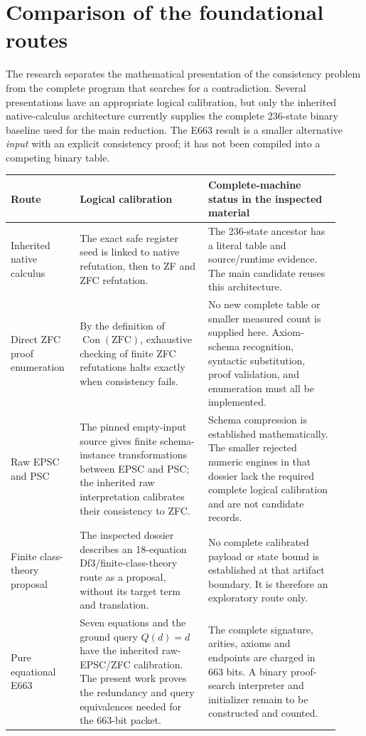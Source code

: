 \section{Comparison of the foundational routes}
\label{sec:formalism-comparison}

The research separates the mathematical presentation of the consistency
problem from the complete program that searches for a contradiction.
Several presentations have an appropriate logical calibration, but only
the inherited native-calculus architecture currently supplies the complete
236-state binary baseline used for the main reduction.  The E663 result
is a smaller alternative \emph{input} with an explicit consistency proof;
it has not been compiled into a competing binary table.

\begin{center}\small
\begin{tabular}{>{\raggedright\arraybackslash}p{0.19\linewidth}>{\raggedright\arraybackslash}p{0.36\linewidth}>{\raggedright\arraybackslash}p{0.37\linewidth}}
\hline
Route & Logical calibration & Complete-machine status in the inspected material\\
\hline
Inherited native calculus &
The exact safe register seed is linked to native refutation, then to ZF
and ZFC refutation. &
The 236-state ancestor has a literal table and source/runtime evidence.
The main candidate reuses this architecture.\\[1mm]
Direct ZFC proof enumeration &
By the definition of $\operatorname{Con}(\mathrm{ZFC})$, exhaustive
checking of finite ZFC refutations halts exactly when consistency fails. &
No new complete table or smaller measured count is supplied here.
Axiom-schema recognition, syntactic substitution, proof validation,
and enumeration must all be implemented.\\[1mm]
Raw EPSC and PSC &
The pinned empty-input source gives finite schema-instance transformations
between EPSC and PSC; the inherited raw interpretation calibrates their
consistency to ZFC. &
Schema compression is established mathematically.  The smaller rejected
numeric engines in that dossier lack the required complete logical
calibration and are not candidate records.\\[1mm]
Finite class-theory proposal &
The inspected dossier describes an 18-equation Df3/finite-class-theory
route as a proposal, without its target term and translation. &
No complete calibrated payload or state bound is established at that
artifact boundary.  It is therefore an exploratory route only.\\[1mm]
Pure equational E663 &
Seven equations and the ground query $Q(d)=d$ have the inherited
raw-EPSC/ZFC calibration.  The present work proves the redundancy and
query equivalences needed for the 663-bit packet. &
The complete signature, arities, axioms and endpoints are charged in
663 bits.  A binary proof-search interpreter and initializer remain
to be constructed and counted.\\
\hline
\end{tabular}
\end{center}


